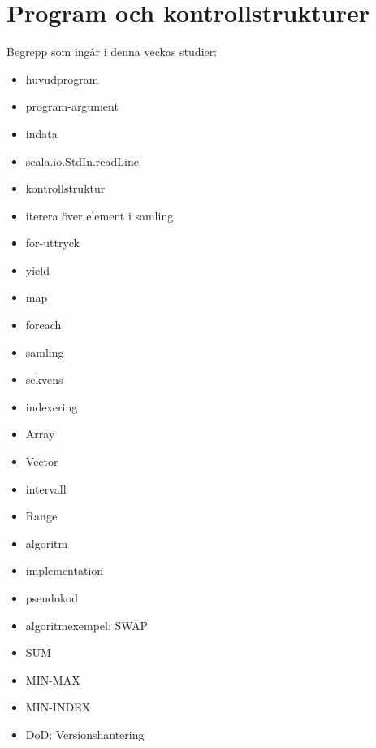 \chapter{Program och kontrollstrukturer}\label{chapter:W02}
Begrepp som ingår i denna veckas studier:
\begin{itemize}[noitemsep,label={$\square$},leftmargin=*]
\item huvudprogram
\item program-argument
\item indata
\item scala.io.StdIn.readLine
\item kontrollstruktur
\item iterera över element i samling
\item for-uttryck
\item yield
\item map
\item foreach
\item samling
\item sekvens
\item indexering
\item Array
\item Vector
\item intervall
\item Range
\item algoritm
\item implementation
\item pseudokod
\item algoritmexempel: SWAP
\item SUM
\item MIN-MAX
\item MIN-INDEX
\item DoD: Versionshantering\end{itemize}

